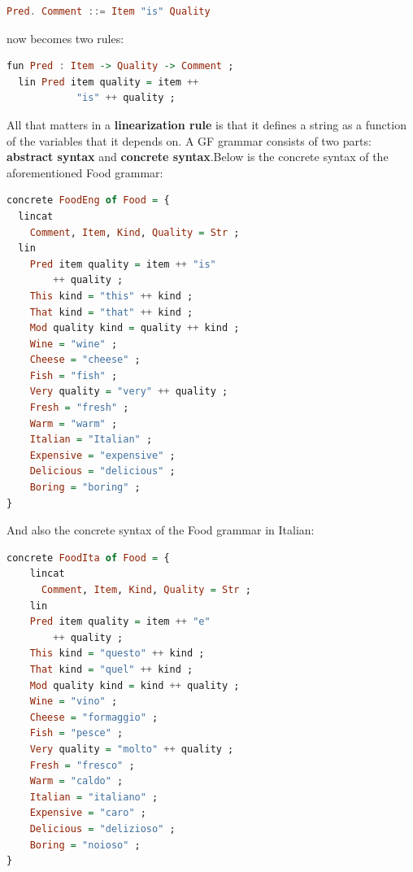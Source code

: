 \begin{lstlisting}[language=haskell,label={lst:gf abs},caption={BNF Notation},captionpos=b, basicstyle=\small\ttfamily]
  Pred. Comment ::= Item "is" Quality
\end{lstlisting}

now becomes two rules:

\begin{lstlisting}[language=haskell,label={lst:gf crt},caption={Grammatical Framework Notation},captionpos=b, basicstyle=\small\ttfamily]
  fun Pred : Item -> Quality -> Comment ;
  lin Pred item quality = item ++
            "is" ++ quality ;
\end{lstlisting}

All that matters in a \textbf{linearization rule} is that it defines a string as a function of the variables that it depends on.
%
A GF grammar consists of two parts: \textbf{abstract syntax} and \textbf{concrete syntax}.Below is the concrete syntax of the aforementioned Food grammar:

\begin{lstlisting}[language=haskell,label={lst:gf crt food grammar},caption={The concrete syntax of the Food grammar.},captionpos=b, basicstyle=\small\ttfamily]
  concrete FoodEng of Food = {
  lincat
    Comment, Item, Kind, Quality = Str ;
  lin
    Pred item quality = item ++ "is"
        ++ quality ;
    This kind = "this" ++ kind ;
    That kind = "that" ++ kind ;
    Mod quality kind = quality ++ kind ;
    Wine = "wine" ;
    Cheese = "cheese" ;
    Fish = "fish" ;
    Very quality = "very" ++ quality ;
    Fresh = "fresh" ;
    Warm = "warm" ;
    Italian = "Italian" ;
    Expensive = "expensive" ;
    Delicious = "delicious" ;
    Boring = "boring" ;
}
\end{lstlisting}

And also the concrete syntax of the Food grammar in Italian:

\begin{lstlisting}[language=haskell,label={lst:gf crt food grammar italian},caption={The concrete syntax of the Food grammar in Italian.},captionpos=b, basicstyle=\small\ttfamily]
concrete FoodIta of Food = {
    lincat
      Comment, Item, Kind, Quality = Str ;
    lin
    Pred item quality = item ++ "e"
        ++ quality ;
    This kind = "questo" ++ kind ;
    That kind = "quel" ++ kind ;
    Mod quality kind = kind ++ quality ;
    Wine = "vino" ;
    Cheese = "formaggio" ;
    Fish = "pesce" ;
    Very quality = "molto" ++ quality ;
    Fresh = "fresco" ;
    Warm = "caldo" ;
    Italian = "italiano" ;
    Expensive = "caro" ;
    Delicious = "delizioso" ;
    Boring = "noioso" ;
}
\end{lstlisting}

